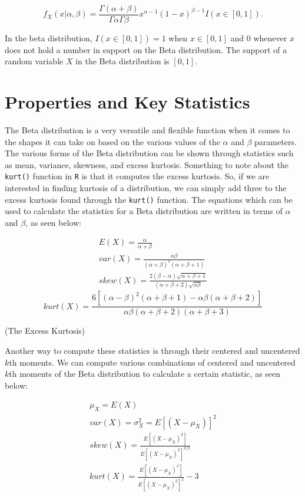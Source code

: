 \documentclass{article}\usepackage[]{graphicx}\usepackage[]{xcolor}
\begin{document}
\begin{multicols}{2}
\[f_X(x|\alpha, \beta) = \frac{\Gamma(\alpha + \beta)}{\Gamma\alpha\Gamma\beta} x^{\alpha-1}(1-x)^{\beta-1}I(x \in [0,1]).\]

\indent In the beta distribution, $I(x \in [0,1]) = 1$ when $x \in [0,1]$ and $0$ whenever $x$ does not hold a number in support on the Beta distribution. The support of a random variable $X$ in the Beta distribution is $[0,1]$.

\section{Properties and Key Statistics}
The Beta distribution is a very versatile and flexible function when it comes to the shapes it can take on based on the various values of the $\alpha$ and $\beta$ parameters. The various forms of the Beta distribution can be shown through statistics such as mean, variance, skewness, and excess kurtosis. Something to note about the \verb|kurt()| function in \texttt{R} is that it computes the excess kurtosis. So, if we are interested in finding kurtosis of a distribution, we can simply add three to the excess kurtosis found through the \verb|kurt()| function. The equations which can be used to calculate the statistics for a Beta distribution are written in terms of $\alpha$ and $\beta$, as seen below:

\begin{align*}
 E(X) = \frac{\alpha}{\alpha + \beta} \tag{The Mean}\\
var(X) = \frac{\alpha\beta}{(\alpha + \beta)^2(\alpha + \beta + 1)} \tag{The Variance} \\
skew(X) = \frac{2(\beta - \alpha)\sqrt{\alpha + \beta + 1}}{(\alpha + \beta + 2)\sqrt{\alpha\beta}} \tag{The Skewness}
\end{align*}
\[kurt(X) = \frac{6[(\alpha - \beta)^2(\alpha + \beta + 1) - \alpha\beta(\alpha + \beta + 2)]}{\alpha\beta(\alpha + \beta + 2)(\alpha + \beta + 3)}\]
\begin{flushright}
(The Excess Kurtosis)
\end{flushright}

Another way to compute these statistics is through their centered and uncentered $k$th moments. We can compute various combinations of centered and uncentered $k$th moments of the Beta distribution to calculate a certain statistic, as seen below:

\begin{align*}
 \mu_X = E(X) \tag{The Mean}\\
 var(X) = \sigma^2_X = E[(X-\mu_X)]^2 \tag{The Variance}\\
 skew(X) = \frac{E[(X - \mu_X)^3]}{E[(X-\mu_X)^2]^{3/2}} \tag{The Skewness}\\
 kurt(X) = \frac{E[(X-\mu_X)^4]}{E[(X-\mu_X)^2]^2} - 3 \tag{The Excess Kurtsosis}
\end{align*}


\end{multicols}
\end{document}
